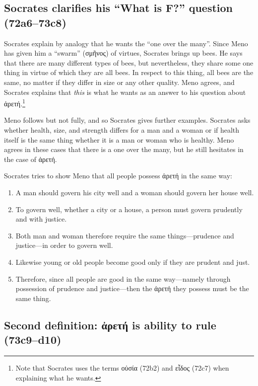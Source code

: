 \documentclass[12pt,letterpaper]{article}
\begin{document}
\subsection{Socrates clarifies his ``What is F?'' question (72a6--73c8)}

Socrates explain by analogy that he wants the ``one over the many''. Since Meno has given him a ``swarm'' (\textgreek{σμῆνος}) of virtues, Socrates brings up bees. He says that there are many different types of bees, but nevertheless, they share some one thing in virtue of which they are all bees. In respect to this thing, all bees are the same, no matter if they differ in size or any other quality. Meno agrees, and Socrates explains that \textit{this} is what he wants as an answer to his question about \textgreek{ἀρετή}.\footnote{Note that Socrates uses the terms \textgreek{οὐσία} (72b2) and \textgreek{εἶδος} (72c7) when explaining what he wants.}

Meno follows but not fully, and so Socrates gives further examples. Socrates asks whether health, size, and strength differs for a man and a woman or if health itself is the same thing whether it is a man or woman who is healthy. Meno agrees in these cases that there is a one over the many, but he still hesitates in the case of \textgreek{ἀρετή}.

Socrates tries to show Meno that all people possess \textgreek{ἀρετή} in the same way:

\begin{enumerate}
    \item A man should govern his city well and a woman should govern her house well.
    \item To govern well, whether a city or a house, a person must govern prudently and with justice.
    \item Both man and woman therefore require the same things—prudence and justice—in order to govern well.
    \item Likewise young or old people become good only if they are prudent and just.
    \item Therefore, since all people are good in the same way—namely through possession of prudence and justice---then the \textgreek{ἀρετή} they possess must be the same thing.
\end{enumerate}

\subsection{Second definition: \textgreek{ἀρετή} is ability to rule (73c9--d10)}
\end{document}
